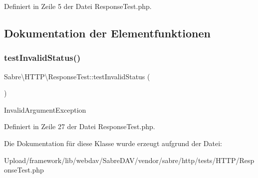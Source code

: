 Definiert in Zeile 5 der Datei Response\+Test.\+php.



\subsection{Dokumentation der Elementfunktionen}
\mbox{\label{class_sabre_1_1_h_t_t_p_1_1_response_test_a4c026a1e343d029b72527bedc92b830b}} 
\subsubsection{\texorpdfstring{test\+Invalid\+Status()}{testInvalidStatus()}}
{\footnotesize\ttfamily Sabre\textbackslash{}\+H\+T\+T\+P\textbackslash{}\+Response\+Test\+::test\+Invalid\+Status (\begin{DoxyParamCaption}{ }\end{DoxyParamCaption})}

Invalid\+Argument\+Exception 

Definiert in Zeile 27 der Datei Response\+Test.\+php.



Die Dokumentation für diese Klasse wurde erzeugt aufgrund der Datei\+:\begin{DoxyCompactItemize}
\item 
Upload/framework/lib/webdav/\+Sabre\+D\+A\+V/vendor/sabre/http/tests/\+H\+T\+T\+P/Response\+Test.\+php\end{DoxyCompactItemize}
